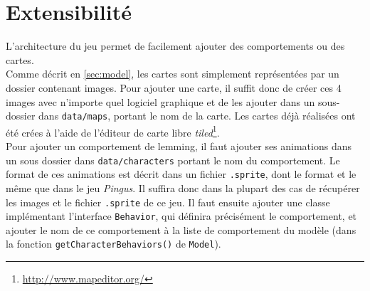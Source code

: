 \documentclass[a4paper,12pt]{article}
\begin{document}
\section{Extensibilité}
L'architecture du jeu permet de facilement ajouter des comportements
ou des cartes.\\

Comme décrit en \ref{sec:model}, les cartes sont simplement
représentées par un dossier contenant images. Pour ajouter une
carte, il suffit donc de créer ces 4 images avec n'importe quel
logiciel graphique et de les ajouter dans un sous-dossier dans
\texttt{data/maps}, portant le nom de la carte. Les cartes déjà
réalisées ont été crées à l'aide de l'éditeur de carte libre
\emph{tiled}\footnote{\url{http://www.mapeditor.org/}}.\\

Pour ajouter un comportement de lemming, il faut ajouter ses
animations dans un sous dossier dans \texttt{data/characters} portant
le nom du comportement. Le format de ces animations est décrit dans un
fichier \texttt{.sprite}, dont le format et le même que dans le jeu
\emph{Pingus}. Il suffira donc dans la plupart des cas de récupérer
les images et le fichier \texttt{.sprite} de ce jeu. Il faut ensuite
ajouter une classe implémentant l'interface \texttt{Behavior}, qui
définira précisément le comportement, et ajouter le nom de ce
comportement à la liste de comportement du modèle (dans la fonction
\texttt{getCharacterBehaviors()} de \texttt{Model}).\\
\end{document}
